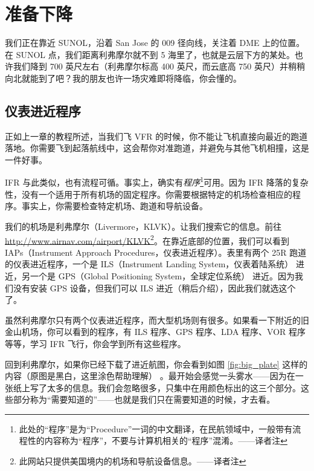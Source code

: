 \section{准备下降}

我们正在靠近 SUNOL，沿着 San Jose 的 009 径向线，关注着 DME 上的位置。在 SUNOL 点，我们距离利弗摩尔就不到 5 海里了，也就是云层下方的某处。也许我们降到 700 英尺左右（利弗摩尔标高 400 英尺，而云底高 750 英尺）并稍稍向北就能到了吧？我的朋友也许一场灾难即将降临，你会懂的。

\subsection{仪表进近程序}

正如上一章的教程所述，当我们飞 VFR 的时候，你不能让飞机直接向最近的跑道落地。你需要飞到起落航线中，这会帮你对准跑道，并避免与其他飞机相撞，这是一件好事。

IFR 与此类似，也有流程可循。事实上，确实有\emph{程序}\footnote{此处的“程序”是为“Procedure”一词的中文翻译，在民航领域中，一般带有流程性的内容称为“程序”，不要与计算机相关的“程序”混淆。——译者注}可用。因为 IFR 降落的复杂性，没有一个适用于所有机场的固定程序。你需要根据特定的机场检查相应的程序。事实上，你需要检查特定机场、跑道和导航设备。

我们的机场是利弗摩尔（Livermore，KLVK）。让我们搜索它的信息。前往 \url{http://www.airnav.com/airport/KLVK}\footnote{此网站只提供美国境内的机场和导航设备信息。——译者注}。在靠近底部的位置，我们可以看到 IAPs（Instrument Approach Procedures，仪表进近程序）。表里有两个 25R 跑道的仪表进近程序，一个是 ILS（Instrument Landing System，仪表着陆系统） 进近，另一个是 GPS（Global Positioning System，全球定位系统） 进近。因为我们没有安装 GPS 设备，但我们可以 ILS 进近（稍后介绍），因此我们就选这个了。

虽然利弗摩尔只有两个仪表进近程序，而大型机场则有很多。如果看一下附近的旧金山机场，你可以看到的程序，有 ILS 程序、GPS 程序、LDA 程序、VOR 程序等等，学习 IFR 飞行，你会学到所有这些程序。

回到利弗摩尔，如果你已经下载了进近航图，你会看到如图 \ref{fig:big_plate} 这样的内容（原图是黑白，这里涂色帮助理解） 。最开始会感觉一头雾水——因为在一张纸上写了太多的信息。我们会忽略很多，只集中在用颜色标出的这三个部分。这些部分称为“需要知道的”——也就是我们只在需要知道的时候，才去看。

